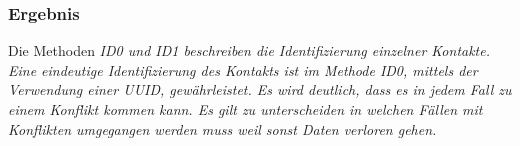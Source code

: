 \subsubsection*{Ergebnis}
Die Methoden \it{ID0} und \it{ID1} beschreiben die Identifizierung einzelner Kontakte. Eine eindeutige Identifizierung des Kontakts ist im Methode \it{ID0}, mittels der Verwendung einer \gls{UUID}, gewährleistet.
Es wird deutlich, dass es in jedem Fall zu einem Konflikt kommen kann. Es gilt zu unterscheiden in welchen Fällen mit Konflikten umgegangen werden muss weil sonst Daten verloren gehen.
